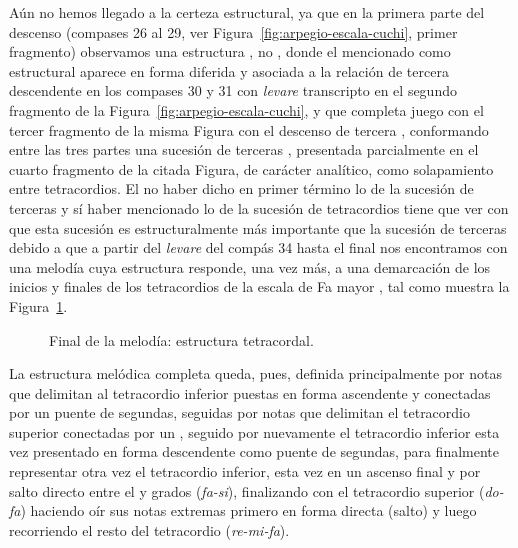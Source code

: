 Aún no hemos llegado a la certeza estructural, ya que en la primera parte del descenso (compases 26 al 29, ver Figura~\ref{fig:arpegio-escala-cuchi}, primer fragmento) observamos una estructura \hbox{,} no , donde el  mencionado como estructural aparece en forma diferida y asociada a la relación de tercera descendente en los compases 30 y 31 con \emph{levare} transcripto en el segundo fragmento de la Figura~\ref{fig:arpegio-escala-cuchi}, y que completa juego con el tercer fragmento de la misma Figura con el descenso de tercera , conformando entre las tres partes una sucesión de terceras , presentada parcialmente en el cuarto fragmento de la citada Figura, de carácter analítico, como solapamiento entre tetracordios. El no haber dicho en primer término lo de la sucesión de terceras y sí haber mencionado lo de la sucesión de tetracordios tiene que ver con que esta sucesión es estructuralmente más importante que la sucesión de terceras debido a que a partir del \emph{levare} del compás 34 hasta el final nos encontramos con una melodía cuya estructura responde, una vez más, a una demarcación de los inicios y finales de los tetracordios de la escala de Fa mayor \hbox{,} tal como muestra la Figura~\ref{fig:final-melo-estructura}.

\begin{figure}[H]
\caption{Final de la melodía: estructura tetracordal.}
\label{fig:final-melo-estructura}
\end{figure}


La estructura melódica completa queda, pues, definida principalmente por notas que delimitan al tetracordio inferior puestas en forma ascendente y conectadas por un puente de segundas, seguidas por notas que delimitan el tetracordio superior conectadas por un , seguido por nuevamente el tetracordio inferior esta vez presentado en forma descendente como puente de segundas, para finalmente representar otra vez el tetracordio inferior, esta vez en un ascenso final y por salto directo entre el  y  grados (\emph{fa-si\bemoltxt}), finalizando con el tetracordio superior (\emph{do-fa}) haciendo oír sus notas extremas primero en forma directa (salto) y luego recorriendo el resto del tetracordio (\emph{re-mi-fa}).

